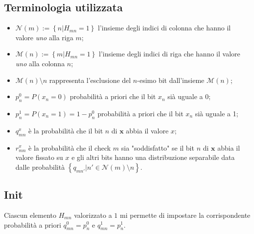 	\subsection{Terminologia utilizzata}
	\begin{itemize}
		\item $\mathcal{N}(m) := \left\{ n | H_{mn} = 1 \right\}$ l'insieme degli indici di colonna che hanno il valore \textit{uno} alla riga $m$;
		\item $\mathcal{M}(n) := \left\{ m | H_{mn} = 1 \right\}$ l'insieme degli indici di riga che hanno il valore \textit{uno} alla colonna $n$;
		\item $\mathcal{M}(n)\setminus n$ rappresenta l'esclusione del $n$-esimo bit dall'insieme $\mathcal{M}(n)$;
		\item $p_n^0 = P(x_n=0)$ probabilità a priori che il bit $x_n$ sià uguale a 0;
		\item $p_n^1 = P(x_n=1)=1-p_n^0$ probabilità a priori che il bit $x_n$ sià uguale a 1;
		\item $q^x_{mn}$ è la probabilità che il bit $n$ di $\textbf{x}$ abbia il valore $x$;
		\item $r^x_{mn}$ è la probabilità che il check $m$ sia "soddisfatto" se il bit $n$ di $\textbf{x}$ abbia il valore fissato su $x$ e gli altri bits hanno una distribuzione separabile data dalle probabilità $\left\{ q_{mn'} | n' \in \mathcal{N}(m)\setminus n\right\}$.
	\end{itemize}
	\subsection{Init}
	Ciascun elemento $H_{mn}$ valorizzato a $1$ mi permette di impostare la corrispondente probabilità a priori $q^0_{mn} = p^0_n$ e $q^1_{mn} = p^1_n$.
